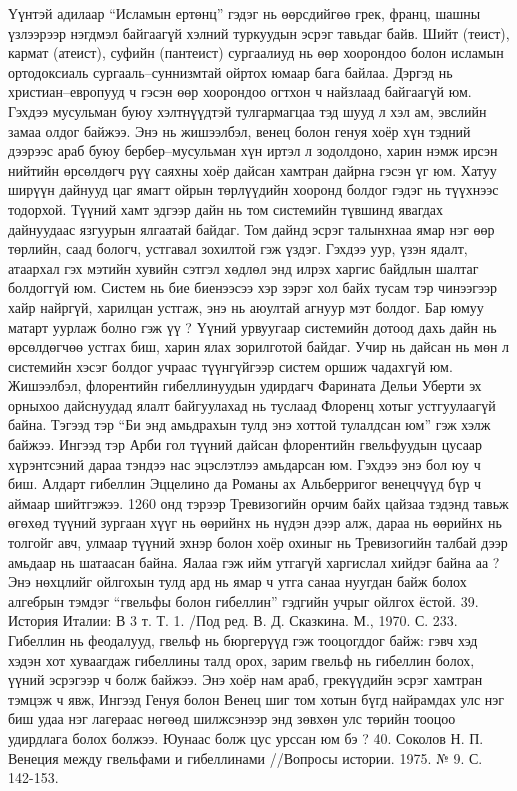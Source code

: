 Үүнтэй адилаар “Исламын ертөнц” гэдэг нь өөрсдийгөө грек, франц, шашны үзлээрээр нэгдмэл байгаагүй хэлний туркуудын эсрэг тавьдаг байв. Шийт (теист), кармат (атеист), суфийн (пантеист) сургаалиуд нь өөр хоорондоо болон исламын ортодоксиаль сургааль–суннизмтай ойртох юмаар бага байлаа. Дэргэд нь христиан–европууд ч гэсэн өөр хоорондоо огтхон ч найзлаад байгаагүй юм. Гэхдээ мусульман буюу хэлтнүүдтэй тулгармагцаа тэд шууд л хэл ам, эвслийн замаа олдог байжээ. Энэ нь жишээлбэл, венец болон генуя хоёр хүн тэдний дээрээс араб буюу бербер–мусульман хүн иртэл л зодолдоно, харин нэмж ирсэн нийтийн өрсөлдөгч рүү саяхны хоёр дайсан хамтран дайрна гэсэн үг юм.
Хатуу ширүүн дайнууд цаг ямагт ойрын төрлүүдийн хооронд болдог гэдэг нь түүхнээс тодорхой. Түүний хамт эдгээр дайн нь том системийн түвшинд явагдах дайнуудаас язгуурын ялгаатай байдаг. Том дайнд эсрэг талынхнаа ямар нэг өөр төрлийн, саад бологч, устгавал зохилтой гэж үздэг. Гэхдээ уур, үзэн ядалт, атаархал гэх мэтийн хувийн сэтгэл хөдлөл энд илрэх харгис байдлын шалтаг болдоггүй юм. Систем нь бие биенээсээ хэр зэрэг хол байх тусам тэр чинээгээр хайр найргүй, харилцан устгаж, энэ нь аюултай агнуур мэт болдог. Бар юмуу матарт уурлаж болно гэж үү ? Үүний урвуугаар системийн дотоод дахь дайн нь өрсөлдөгчөө устгах биш, харин ялах зорилготой байдаг. Учир нь дайсан нь мөн л системийн хэсэг болдог учраас түүнгүйгээр систем оршиж чадахгүй юм. Жишээлбэл, флорентийн гибеллинуудын удирдагч Фарината Дельи Уберти эх орныхоо дайснуудад ялалт байгуулахад нь туслаад Флоренц хотыг устгуулаагүй байна. Тэгээд тэр “Би энд амьдрахын тулд энэ хоттой тулалдсан юм” гэж хэлж байжээ. Ингээд тэр Арби гол түүний дайсан флорентийн гвельфуудын цусаар хүрэнтсэний дараа тэндээ нас эцэслэтлээ амьдарсан юм.
Гэхдээ энэ бол юу ч биш. Алдарт гибеллин Эццелино да Романы ах Альберригог венецчүүд бүр ч аймаар шийтгэжээ. 1260 онд тэрээр Тревизогийн орчим байх цайзаа тэдэнд тавьж өгөхөд түүний зургаан хүүг нь өөрийнх нь нүдэн дээр алж, дараа нь өөрийнх нь толгойг авч, улмаар түүний эхнэр болон хоёр охиныг нь Тревизогийн талбай дээр амьдаар нь шатаасан байна. Яалаа гэж ийм утгагүй харгислал хийдэг байна аа ?
Энэ нөхцлийг ойлгохын тулд ард нь ямар ч утга санаа нуугдан байж болох алгебрын тэмдэг “гвельфы болон гибеллин” гэдгийн учрыг ойлгох ёстой. 39. История Италии: В 3 т. Т. 1. /Под ред. В. Д. Сказкина. М., 1970. С. 233. Гибеллин нь феодалууд, гвельф нь бюргерүүд гэж тооцогддог байж: гэвч хэд хэдэн хот хуваагдаж гибеллины талд орох, зарим гвельф нь гибеллин болох, үүний эсрэгээр ч болж байжээ. Энэ хоёр нам араб, грекүүдийн эсрэг хамтран тэмцэж ч явж, Ингээд Генуя болон Венец шиг том хотын бүгд найрамдах улс нэг биш удаа нэг лагераас нөгөөд шилжсэнээр энд зөвхөн улс төрийн тооцоо удирдлага болох болжээ. Юунаас болж цус урссан юм бэ ? 40. Соколов Н. П. Венеция между гвельфами и гибеллинами //Вопросы истории. 1975. № 9. С. 142-153.
